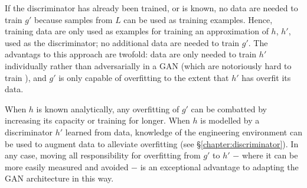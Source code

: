 \documentclass[../../main.tex]{subfiles}
\begin{document}
If the discriminator has already been trained, or is known, no data are needed to train $g'$ because samples from $L$ can be used as training examples.
Hence, training data are only used as examples for training an approximation of $h$, $h'$, used as the discriminator; no additional data are needed to train $g'$.
The advantags to this approach are twofold: data are only needed to train $h'$ individually rather than adversarially in a GAN (which are notoriously hard to train \cite{bang18}), and $g'$ is only capable of overfitting to the extent that $h'$ has overfit its data.

When $h$ is known analytically, any overfitting of $g'$ can be combatted by increasing its capacity or training for longer.
When $h$ is modelled by a discriminator $h'$ learned from data, knowledge of the engineering environment can be used to augment data to alleviate overfitting (see \S\ref{chapter:discriminator}).
In any case, moving all responsibility for overfitting from $g'$ to $h'$ $-$ where it can be more easily measured and avoided $-$ is an exceptional advantage to adapting the GAN architecture in this way.
\end{document}
